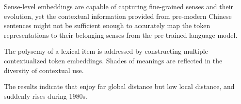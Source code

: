 \begin{exe}
\end{exe}

Sense-level embeddings are capable of capturing fine-grained senses and their evolution, yet the contextual information provided from pre-modern Chinese sentences might not be sufficient enough to accurately map the token representations to their belonging senses from the pre-trained language model.


The polysemy of a lexical item is addressed by constructing multiple contextualized token embeddings. Shades of meanings are reflected in the diversity of contextual use.

The results indicate that \jia enjoy far global distance but low local distance, and suddenly rises during 1980s.


